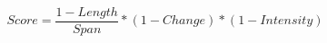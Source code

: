 
\begin{equation} \label{eq:score}
Score = \frac{1-Length}{Span} * (1 - Change)*(1-Intensity)
\end{equation}

